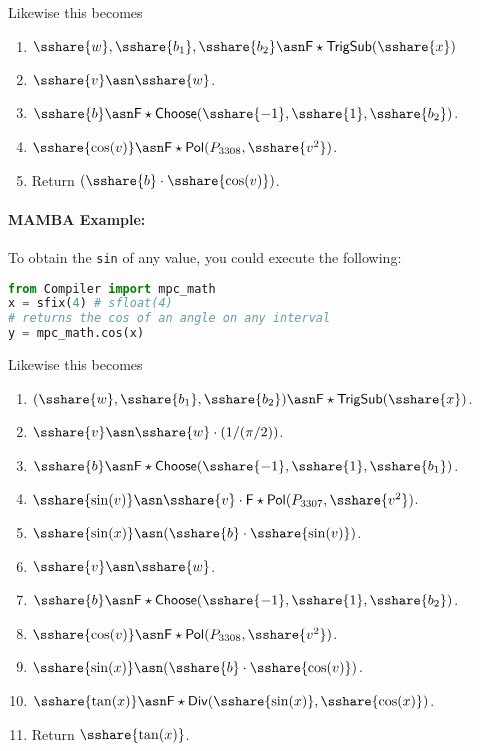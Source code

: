   Likewise this becomes
  \begin{enumerate}

    \item $\sshare{w}, \sshare{b_1}, \sshare{b_2} \asn \mathsf{F\star TrigSub}(\sshare{x})$
    \item $\sshare{v} \asn \sshare{w}$.
    \item $\sshare{b} \asn \mathsf{F\star Choose}(\sshare{-1},\sshare{1}, \sshare{b_2})$.
    \item $\sshare{\cos(v)} \asn  \mathsf{F\star Pol}(P_{3308},\sshare{v^2})$.
    \item Return $(\sshare{b} \cdot \sshare{\cos(v)})$.

  \end{enumerate}

  \paragraph{MAMBA Example:} To obtain the \verb|sin| of any value, you could execute the following:
  \begin{lstlisting}[language={python}]
from Compiler import mpc_math
x = sfix(4) # sfloat(4)
# returns the cos of an angle on any interval
y = mpc_math.cos(x)
\end{lstlisting}

  Likewise this becomes
  \begin{enumerate}

    \item $(\sshare{w},\sshare{b_1},\sshare{b_2}) \asn \mathsf{F\star TrigSub}(\sshare{x})$.
    \item $\sshare{v} \asn \sshare{w} \cdot (1/(\pi/2))$.
    \item $\sshare{b} \asn \mathsf{F\star Choose}(\sshare{-1},\sshare{1}, \sshare{b_1})$.
    \item $\sshare{\sin(v)} \asn \sshare{v} \cdot \mathsf{F\star Pol}(P_{3307},\sshare{v^2})$.
    \item $\sshare{\sin(x)} \asn (\sshare{b} \cdot \sshare{\sin(v)})$.
    \item $\sshare{v} \asn \sshare{w}$.
    \item $\sshare{b} \asn \mathsf{F\star Choose}(\sshare{-1},\sshare{1}, \sshare{b_2})$.
    \item $\sshare{\cos(v)} \asn  \mathsf{F\star Pol}(P_{3308},\sshare{v^2})$.
    \item $\sshare{\sin(x)} \asn (\sshare{b} \cdot \sshare{\cos(v)})$.
    \item $\sshare{\tan(x)} \asn \mathsf{F\star Div}(\sshare{\sin(x)},\sshare{\cos(x)})$.
    \item Return $\sshare{\tan(x)}$.
  \end{enumerate}

